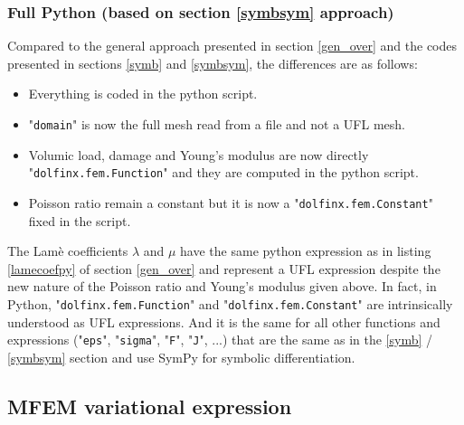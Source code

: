 \documentclass[12pt]{article}
\newcommand{\mycodepy}[1]{\textsf{"}\lstinline[language=Python]`#1`\textsf{"}}
\begin{document}
\subsubsection{Full Python (based on section \ref{symbsym} approach)} 
Compared to the general approach presented in section \ref{gen_over} and the codes presented in sections \ref{symb} and \ref{symbsym}, the differences are as follows:
\begin{itemize}
	\item Everything is coded in the python script.
	\item \mycodepy{domain} is now the full mesh read from a file and not a UFL mesh.
	\item Volumic load, damage and Young's modulus   are now directly \mycodepy{dolfinx.fem.Function} and they are computed  in the python script.
	\item Poisson ratio remain a constant but it is now a \mycodepy{dolfinx.fem.Constant} fixed in the script. 
\end{itemize}
 The Lamè coefficients $\lambda$ and $\mu$ have the same python expression as in listing \ref{lamecoefpy} of section \ref{gen_over} and represent a UFL expression despite the new nature of the Poisson ratio and Young's modulus given above. In fact, in Python, \mycodepy{dolfinx.fem.Function} and \mycodepy{dolfinx.fem.Constant} are intrinsically understood as UFL expressions. And it is the same for all other functions and expressions (\mycodepy{eps}, \mycodepy{sigma}, \mycodepy{F}, \mycodepy{J}, ...) that are the same as in the \ref{symb} / \ref{symbsym} section and use SymPy for symbolic differentiation.
\subsection{MFEM variational expression\label{mfem_variational}}
\end{document}
